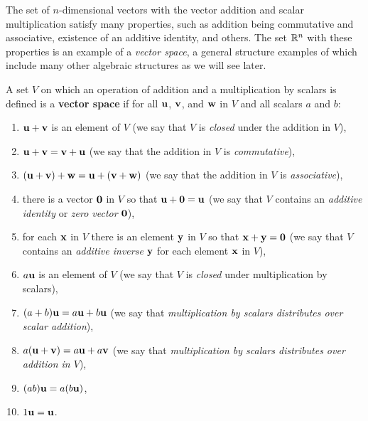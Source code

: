 

\label{sec:vec_spaces}

The set of $n$-dimensional vectors with the vector addition and scalar multiplication satisfy many properties, such as addition being commutative and associative, existence of an additive identity, and others. The set $\mathbb{R}^n$ with these properties is an example of a \emph{vector space}, a general structure examples of which include many other algebraic structures as we will see later.

\begin{definition} \label{def:3_a_1} A set $V$ on which an operation of addition and a multiplication by scalars is defined is a \textbf{vector space} if for all $\mathbf{u}$, $\mathbf{v}$, and $\mathbf{w}$ in $V$ and all scalars $a$ and $b$:
\begin{enumerate}
\item $\mathbf{u} + \mathbf{v}$ is an element of $V$ (we say that $V$ is \emph{closed} under the addition in $V$),
\item $\mathbf{u} + \mathbf{v} = \mathbf{v} + \mathbf{u}$ (we say that the addition in $V$ is \emph{commutative}),
\item $(\mathbf{u} + \mathbf{v}) + \mathbf{w} = \mathbf{u} + (\mathbf{v} + \mathbf{w})$ (we say that the addition in $V$ is \emph{associative}),
\item there is a vector $\mathbf{0}$ in $V$ so that $\mathbf{u} + \mathbf{0} = \mathbf{u}$ (we say that $V$ contains an \emph{additive identity} or \emph{zero vector} $\mathbf{0}$),
\item for each $\mathbf{x}$ in $V$ there is an element $\mathbf{y}$ in $V$ so that $\mathbf{x} + \mathbf{y} = \mathbf{0}$ (we say that $V$ contains an \emph{additive inverse} $\mathbf{y}$ for each element $\mathbf{x}$ in $V$),
\item $a \mathbf{u}$ is an element of $V$ (we say that $V$ is \emph{closed} under multiplication by scalars),
\item $(a+b) \mathbf{u} = a\mathbf{u} + b\mathbf{u}$ (we say that \emph{multiplication by scalars distributes over scalar addition}),
\item $a(\mathbf{u} + \mathbf{v}) = a\mathbf{u} + a\mathbf{v}$ (we say that \emph{multiplication by scalars distributes over addition in $V$}),
\item $(ab) \mathbf{u} = a(b\mathbf{u})$,
\item $1 \mathbf{u} = \mathbf{u}$.
\end{enumerate}
\end{definition}

